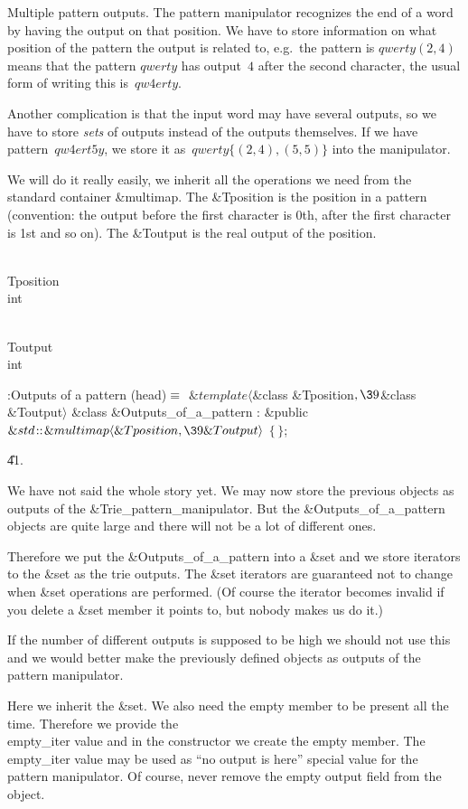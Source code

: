 Multiple pattern outputs. The pattern manipulator recognizes the end
of a word by having the output on that position. We have to store
information on what position of the pattern the output is related to,
e.g.~the pattern is $qwerty(2,4)$ means that the pattern $qwerty$ has
output~$4$ after the second character, the usual form of writing this
is~$qw4erty$.

Another complication is that the input word may have several outputs, so
we have to store {\it sets\/} of outputs instead of the outputs
themselves. If we have pattern~$qw4ert5y$, we store it
as~$qwerty\{(2,4),(5,5)\}$ into the manipulator.

We will do it really easily, we inherit all the operations we need from
the standard container \&{multimap}. The \&{Tposition} is the position in a
pattern (convention: the output before the first character is 0th, after
the first character is 1st and so on). The \&{Toutput} is the real output
of the position.

\Y\B\F\\{Tposition} \5
\\{int}\par
\B\F\\{Toutput} \5
\\{int}\par
\Y\B\4:Outputs of a pattern (head)\X${}\equiv{}$\6
$\&{template}\langle{}$\&{class} \&{Tposition}${},\39{}$\&{class} %
\&{Toutput}${}\rangle{}$\6
\&{class} \&{Outputs\_of\_a\_pattern} :\6
\&{public} ${}\&{std}\DC\&{multimap}\langle\&{Tposition},\39\&{Toutput}%
\rangle{}$\6
${}\{\,\}{}$;\par
\U41.\fi

We have not said the whole story yet. We may now store the previous
objects as outputs of the \&{Trie\_pattern\_manipulator}. But the
\&{Outputs\_of\_a\_pattern} objects are quite large and there will not be a
lot of different ones.

Therefore we put the \&{Outputs\_of\_a\_pattern} into a \&{set} and we store
iterators to the \&{set} as the trie outputs. The \&{set} iterators are
guaranteed not to change when \&{set} operations are performed. (Of course
the iterator becomes invalid if you delete a \&{set} member it points to,
but nobody makes us do it.)

If the number of different outputs is supposed to be high we should not
use this and we would better make the previously defined objects as
outputs of the pattern manipulator.

Here we inherit the \&{set}. We also need the empty member to be present
all the time. Therefore we provide the \\{empty\_iter} value and in the
constructor we create the empty member. The \\{empty\_iter} value may be
used as ``no output is here'' special value for the pattern manipulator.
Of course, never remove the empty output field from the object.

